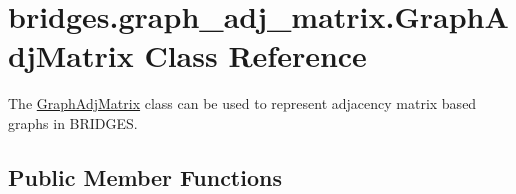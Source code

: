 \hypertarget{classbridges_1_1graph__adj__matrix_1_1_graph_adj_matrix}{}\section{bridges.\+graph\+\_\+adj\+\_\+matrix.\+Graph\+Adj\+Matrix Class Reference}
\label{classbridges_1_1graph__adj__matrix_1_1_graph_adj_matrix}


The \mbox{\hyperlink{classbridges_1_1graph__adj__matrix_1_1_graph_adj_matrix}{Graph\+Adj\+Matrix}} class can be used to represent adjacency matrix based graphs in B\+R\+I\+D\+G\+ES.  


\subsection*{Public Member Functions}
